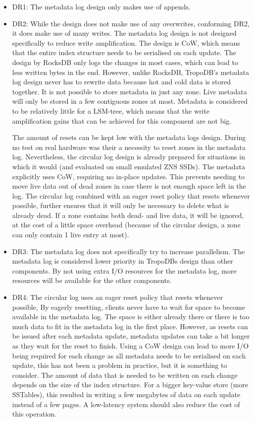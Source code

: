 \begin{itemize}
    \item DR1: The metadata log design only makes use of appends.
    \item DR2: While the design does not make use of any overwrites, conforming DR2, it does make use of many writes. The metadata log design is not designed specifically to reduce write amplification. The design is CoW, which means that the entire index structure needs to be serialised on each update. The design by RocksDB only logs the changes in most cases, which can lead to less written bytes in the end. However, unlike RocksDB, TropoDB's metadata log design never has to rewrite data because hot and cold data is stored together. It is not possible to store metadata in just any zone. Live metadata will only be stored in a few contiguous zones at most. Metadata is considered to be relatively little for a LSM-tree, which means that the write amplification gains that can be achieved for this component are not big.
    
    The amount of resets can be kept low with the metadata logs design. During no test on real hardware was their a necessity to reset zones in the metadata log. Nevertheless, the circular log design is already prepared for situations in which it would (and evaluated on small emulated ZNS SSDs). The metadata explicitly uses CoW, requiring no in-place updates. This prevents needing to move live data out of dead zones in case there is not enough space left in the log. The circular log combined with an eager reset policy that resets whenever possible, further ensures that it will only be necessary to delete what is already dead. If a zone contains both dead- and live data, it will be ignored, at the cost of a little space overhead (because of the circular design, a zone can only contain 1 live entry at most). 
    \item DR3: The metadata log does not specifically try to increase parallelism. The metadata log is considered lower priority in TropoDBs design than other components. By not using extra I/O resources for the metadata log, more resources will be available for the other components.  
    \item DR4: The circular log uses an eager reset policy that resets whenever possible, By eagerly resetting, clients never have to wait for space to become available in the metadata log. The space is either already there or there is too much data to fit in the metadata log in the first place. However, as resets can be issued after each metadata update, metadata updates can take a bit longer as they wait for the reset to finish. Using a CoW design can lead to more I/O being required for each change as all metadata needs to be serialised on each update, this has not been a problem in practice, but it is something to consider. The amount of data that is needed to be written on each change depends on the size of the index structure. For a bigger key-value store (more SSTables), this resulted in writing a few megabytes of data on each update instead of a few pages. A low-latency system should also reduce the cost of this operation.
\end{itemize}

